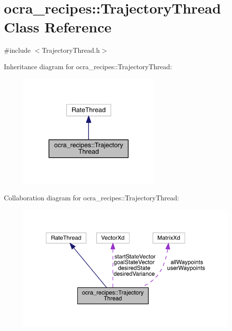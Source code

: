 \hypertarget{classocra__recipes_1_1TrajectoryThread}{}\section{ocra\+\_\+recipes\+:\+:Trajectory\+Thread Class Reference}
\label{classocra__recipes_1_1TrajectoryThread}


{\ttfamily \#include $<$Trajectory\+Thread.\+h$>$}



Inheritance diagram for ocra\+\_\+recipes\+:\+:Trajectory\+Thread\+:\nopagebreak
\begin{figure}[H]
\begin{center}
\leavevmode
\includegraphics[width=203pt]{de/d23/classocra__recipes_1_1TrajectoryThread__inherit__graph}
\end{center}
\end{figure}


Collaboration diagram for ocra\+\_\+recipes\+:\+:Trajectory\+Thread\+:\nopagebreak
\begin{figure}[H]
\begin{center}
\leavevmode
\includegraphics[width=350pt]{dc/de5/classocra__recipes_1_1TrajectoryThread__coll__graph}
\end{center}
\end{figure}
